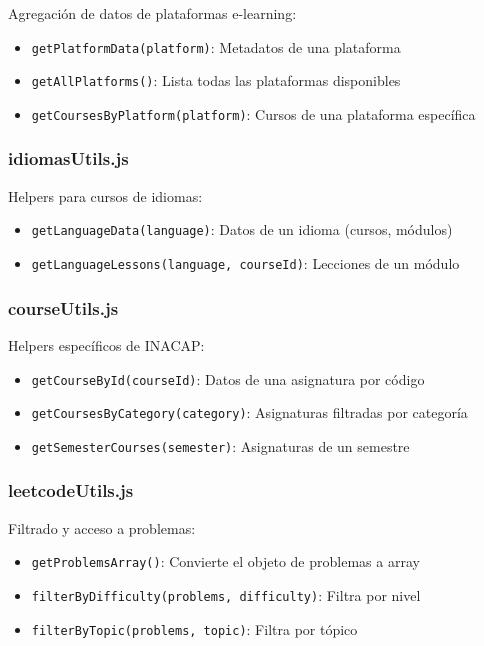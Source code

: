 \documentclass[12pt,a4paper]{article}
\begin{document}
Agregación de datos de plataformas e-learning:
\begin{itemize}
  \item \texttt{getPlatformData(platform)}: Metadatos de una plataforma
  \item \texttt{getAllPlatforms()}: Lista todas las plataformas disponibles
  \item \texttt{getCoursesByPlatform(platform)}: Cursos de una plataforma específica
\end{itemize}

\subsubsection{idiomasUtils.js}

Helpers para cursos de idiomas:
\begin{itemize}
  \item \texttt{getLanguageData(language)}: Datos de un idioma (cursos, módulos)
  \item \texttt{getLanguageLessons(language, courseId)}: Lecciones de un módulo
\end{itemize}

\subsubsection{courseUtils.js}

Helpers específicos de INACAP:
\begin{itemize}
  \item \texttt{getCourseById(courseId)}: Datos de una asignatura por código
  \item \texttt{getCoursesByCategory(category)}: Asignaturas filtradas por categoría
  \item \texttt{getSemesterCourses(semester)}: Asignaturas de un semestre
\end{itemize}

\subsubsection{leetcodeUtils.js}

Filtrado y acceso a problemas:
\begin{itemize}
  \item \texttt{getProblemsArray()}: Convierte el objeto de problemas a array
  \item \texttt{filterByDifficulty(problems, difficulty)}: Filtra por nivel
  \item \texttt{filterByTopic(problems, topic)}: Filtra por tópico
\end{itemize}
\end{document}
